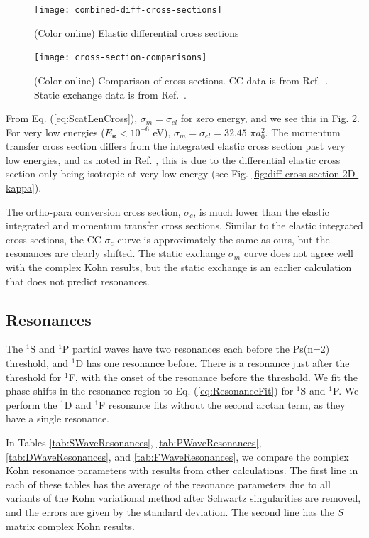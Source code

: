 \documentclass[preprint,showpacs,preprintnumbers,amsmath,amssymb,longbibliography,pra,aps]{revtex4-1}
\begin{document}
\begin{figure}[H]
	\centering
	\texttt{[image: combined-diff-cross-sections]}
	\caption{(Color online) Elastic differential cross sections}
	\label{fig:combined-diff-cross-sections}
\end{figure}

\begin{figure}[H]
	\centering
	\texttt{[image: cross-section-comparisons]}
	\caption{(Color online) Comparison of cross sections. CC data is from Ref.~\cite{Blackwood2002}. Static exchange data is from Ref.~\cite{Hara1975}.}
	\label{fig:cross-section-comparisons}
\end{figure}

From Eq. (\ref{eq:ScatLenCross}), $\sigma_m = \sigma_{el}$ for zero energy, and we see this in Fig. \ref{fig:cross-section-comparisons}. For very low energies ($E_{\bm \kappa} < 10^{-6}$ eV), $\sigma_m = \sigma_{el} = 32.45$ $\pi a_0^2$. The momentum transfer cross section differs from the integrated elastic cross section past very low energies, and as noted in Ref. \cite{Blackwood2002c}, this is due to the differential elastic cross section only being isotropic at very low energy (see Fig. \ref{fig:diff-cross-section-2D-kappa}).

The ortho-para conversion cross section, $\sigma_c$, is much lower than the elastic integrated and momentum transfer cross sections. Similar to the elastic integrated cross sections, the CC $\sigma_c$ curve \cite{Blackwood2002} is approximately the same as ours, but the resonances are clearly shifted. The static exchange $\sigma_m$ curve \cite{Hara1975} does not agree well with the complex Kohn results, but the static exchange is an earlier calculation that does not predict resonances.

\subsection{Resonances}
\label{sec:Resonances}
The $^1$S and $^1$P partial waves have two resonances each before the Ps(n=2) threshold, and $^1$D has one resonance before. There is a resonance just after the threshold for $^1$F, with the onset of the resonance before the threshold. We fit the phase shifts in the resonance region to Eq. (\ref{eq:ResonanceFit}) for $^1$S and $^1$P. We perform the $^1$D and $^1$F resonance fits without the second arctan term, as they have a single resonance.

In Tables \ref{tab:SWaveResonances}, \ref{tab:PWaveResonances}, \ref{tab:DWaveResonances}, and \ref{tab:FWaveResonances}, we compare the complex Kohn resonance parameters with results from other calculations. 
The first line in each of these tables has the average of the resonance parameters due to all variants of the Kohn variational method after Schwartz singularities are removed, and the errors are given by the standard deviation. The second line has the $S$ matrix complex Kohn results.
\end{document}
